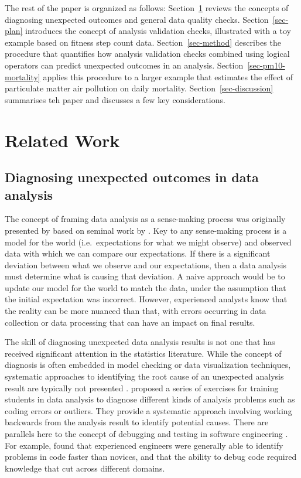 \documentclass[
  12pt,
]{interact}
\begin{document}
The rest of the paper is organized as follows:
Section~\ref{sec-lit-review} reviews the concepts of diagnosing
unexpected outcomes and general data quality checks.
Section~\ref{sec-plan} introduces the concept of analysis validation
checks, illustrated with a toy example based on fitness step count data.
Section~\ref{sec-method} describes the procedure that quantifies how
analysis validation checks combined using logical operators can predict
unexpected outcomes in an analysis. Section~\ref{sec-pm10-mortality}
applies this procedure to a larger example that estimates the effect of
particulate matter air pollution on daily mortality.
Section~\ref{sec-discussion} summarises teh paper and discusses a few
key considerations.

\section{Related Work}\label{sec-lit-review}

\subsection{Diagnosing unexpected outcomes in data
analysis}\label{diagnosing-unexpected-outcomes-in-data-analysis}

The concept of framing data analysis as a sense-making process was
originally presented by \citet{grolemund_cognitive_2014} based on
seminal work by \citet{wild1999statistical}. Key to any sense-making
process is a model for the world (i.e.~expectations for what we might
observe) and observed data with which we can compare our expectations.
If there is a significant deviation between what we observe and our
expectations, then a data analysis must determine what is causing that
deviation. A naive approach would be to update our model for the world
to match the data, under the assumption that the initial expectation was
incorrect. However, experienced analysts know that the reality can be
more nuanced than that, with errors occurring in data collection or data
processing that can have an impact on final results.

The skill of diagnosing unexpected data analysis results is not one that
has received significant attention in the statistics literature. While
the concept of diagnosis is often embedded in model checking or data
visualization techniques, systematic approaches to identifying the root
cause of an unexpected analysis result are typically not presented
\citep{peng2022perspective}. \citet{peng_diagnosing_2021} proposed a
series of exercises for training students in data analysis to diagnose
different kinds of analysis problems such as coding errors or outliers.
They provide a systematic approach involving working backwards from the
analysis result to identify potential causes. There are parallels here
to the concept of debugging and testing in software engineering
\citep{donoghue2021teaching}. For example, \citet{li2019towards} found
that experienced engineers were generally able to identify problems in
code faster than novices, and that the ability to debug code required
knowledge that cut across different domains.
\end{document}
